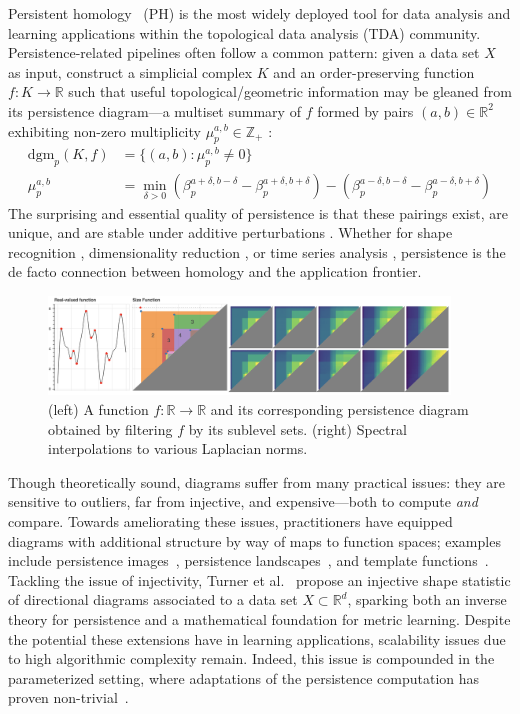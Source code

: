 \documentclass[pdflatex,sn-mathphys-num]{sn-jnl}
\newcommand{\dgm}[0]{\mathrm{dgm}}
\begin{document}
Persistent homology~\cite{edelsbrunner2000topological} (PH) is the most widely deployed tool for data analysis and learning applications within the topological data analysis (TDA) community. 
Persistence-related pipelines often follow a common pattern: given a data set $X$ as input, construct a simplicial complex $K$ and an order-preserving function $f: K \to \mathbb{R}$ such that useful topological/geometric information may be gleaned from its persistence diagram—a multiset summary of $f$ formed by pairs $(a, b) \in \mathbb{R}^2$ exhibiting non-zero multiplicity $\mu_p^{a , b} \in \mathbb{Z}_+$ \cite{cerri2013betti}: 
\begin{align}
	\dgm_p (K, f) &= \{ (a,b) : \mu_p^{a,b} \neq 0 \} \\
	\mu_p^{a,b} &= \min_{\delta > 0} (\beta_p^{a+\delta, b-\delta} - \beta_p^{a+\delta, b+\delta}) - (\beta_p^{a-\delta, b-\delta} - \beta_p^{a-\delta, b+\delta})  \label{eq:dgm}
\end{align}
\noindent The surprising and essential quality of persistence is that these pairings exist, are unique, and are stable under additive perturbations \cite{cohen2005stability}. Whether for shape recognition \cite{chazal2009gromov}, dimensionality reduction \cite{scoccola2023fibered}, or time series analysis \cite{perea2016persistent}, persistence is the de facto connection between homology and the application frontier.

\begin{figure}\label{fig:overview}
\centering
\includegraphics[width=0.95\textwidth]{../images/spectral_relax_size_func.png}	
\caption{ (left) A function $f: \mathbb{R} \to \mathbb{R}$ and its corresponding persistence diagram obtained by filtering $f$ by its sublevel sets. (right) Spectral interpolations to various Laplacian norms. }
\end{figure}

Though theoretically sound, diagrams suffer from many practical issues: they are sensitive to outliers, far from injective, and expensive---both to compute \textit{and} compare. Towards ameliorating these issues, practitioners have equipped diagrams with additional structure by way of maps to function spaces; examples include persistence images~\cite{adams2017persistence}, persistence landscapes~\cite{bubenik2015statistical}, and template functions~\cite{perea2022approximating}. Tackling the issue of injectivity, Turner et al.~\cite{turner2014persistent} propose an injective shape statistic of directional diagrams associated to a data set $X \subset \mathbb{R}^d$, sparking both an inverse theory for persistence and a mathematical foundation for metric learning. Despite the potential these extensions have in learning applications, scalability issues due to high algorithmic complexity remain. Indeed, this issue is compounded in the parameterized setting, where adaptations of the persistence computation has proven non-trivial~\cite{piekenbrock2021move}.
\end{document}

